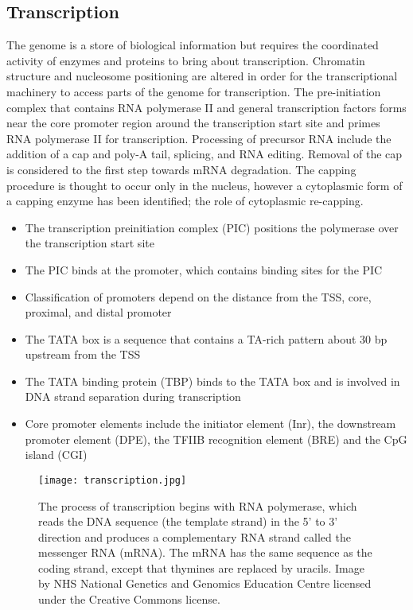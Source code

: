 \subsection{Transcription}

The genome is a store of biological information but requires the coordinated activity of enzymes and proteins to bring about transcription. Chromatin structure and nucleosome positioning are altered in order for the transcriptional machinery to access parts of the genome for transcription. The pre-initiation complex that contains RNA polymerase II and general transcription factors forms near the core promoter region around the transcription start site and primes RNA polymerase II for transcription. Processing of precursor RNA include the addition of a cap and poly-A tail, splicing, and RNA editing. Removal of the cap is considered to the first step towards mRNA degradation. The capping procedure is thought to occur only in the nucleus, however a cytoplasmic form of a capping enzyme has been identified; the role of cytoplasmic re-capping.

\begin{itemize}

   \item The transcription preinitiation complex (PIC) positions the polymerase over the transcription start site
   \item The PIC binds at the promoter, which contains binding sites for the PIC
   \item Classification of promoters depend on the distance from the TSS, core, proximal, and distal promoter
   \item The TATA box is a sequence that contains a TA-rich pattern about 30 bp upstream from the TSS
   \item The TATA binding protein (TBP) binds to the TATA box and is involved in DNA strand separation during transcription
   \item Core promoter elements include the initiator element (Inr), the downstream promoter element (DPE), the TFIIB recognition element (BRE) and the CpG island (CGI)

\end{itemize}

\begin{figure}[h]
   \centering
   \texttt{[image: transcription.jpg]}
   \caption[DNA transcription]{The process of transcription begins with RNA polymerase, which reads the DNA sequence (the template strand) in the 5' to 3' direction and produces a complementary RNA strand called the messenger RNA (mRNA). The mRNA has the same sequence as the coding strand, except that thymines are replaced by uracils. Image by NHS National Genetics and Genomics Education Centre licensed under the Creative Commons license.}
   \label{fig:transcription}
\end{figure}

